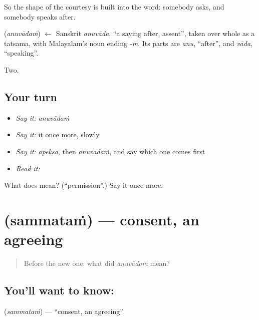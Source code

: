 So the shape of the courtesy is built into the word: somebody asks, and somebody speaks after.

\begin{cousinweb}
\textbf{} (\emph{anuvādaṁ}) $\leftarrow$ Sanskrit \emph{anuvāda}, \textquotedblleft{}a saying after, assent\textquotedblright{}, taken over whole as a tatsama, with Malayalam's noun ending \emph{-ṁ}. Its parts are \emph{anu}, \textquotedblleft{}after\textquotedblright{}, and \emph{vāda}, \textquotedblleft{}speaking\textquotedblright{}.
\end{cousinweb}

\begin{grammarlens}[title={What you've built}]
Two.
\end{grammarlens}

\subsection*{Your turn}
\begin{itemize}
\raggedright
  \item \emph{Say it:} \emph{anuvādaṁ}
  \item \emph{Say it:} it once more, slowly
  \item \emph{Say it:} \emph{apēkṣa}, then \emph{anuvādaṁ}, and say which one comes first
  \item \emph{Read it:} \textbf{}
\end{itemize}

\begin{tcolorbox}[breakable,colback=teal!4,colframe=teal!35!black,title={Before you move on}]
What does  mean? (\textquotedblleft{}permission\textquotedblright{}.) Say it once more.
\end{tcolorbox}
\section[\texorpdfstring{\ml{സമ്മതം} (sammataṁ)}{സമ്മതം (sammataṁ)}]{ (sammataṁ) — consent, an agreeing}

\label{lesson:ML-C65-consent}



\begin{quote}
Before the new one: what did \emph{anuvādaṁ} mean?
\end{quote}

\subsection*{You'll want to know: }
\textbf{} (\emph{sammataṁ}) — \textquotedblleft{}consent, an agreeing\textquotedblright{}.

